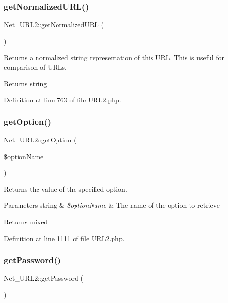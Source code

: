 \subsubsection{\texorpdfstring{get\+Normalized\+U\+R\+L()}{getNormalizedURL()}}
{\footnotesize\ttfamily Net\+\_\+\+U\+R\+L2\+::get\+Normalized\+U\+RL (\begin{DoxyParamCaption}{ }\end{DoxyParamCaption})}

Returns a normalized string representation of this U\+RL. This is useful for comparison of U\+R\+Ls.

\begin{DoxyReturn}{Returns}
string 
\end{DoxyReturn}


Definition at line 763 of file U\+R\+L2.\+php.

\mbox{\label{classNet__URL2_a4da2891e3eac1700940ae6cf483a0dd3}} 
\subsubsection{\texorpdfstring{get\+Option()}{getOption()}}
{\footnotesize\ttfamily Net\+\_\+\+U\+R\+L2\+::get\+Option (\begin{DoxyParamCaption}\item[{}]{\$option\+Name }\end{DoxyParamCaption})}

Returns the value of the specified option.


\begin{DoxyParams}[1]{Parameters}
string & {\em \$option\+Name} & The name of the option to retrieve\\
\hline
\end{DoxyParams}
\begin{DoxyReturn}{Returns}
mixed 
\end{DoxyReturn}


Definition at line 1111 of file U\+R\+L2.\+php.

\mbox{\label{classNet__URL2_a8cfbc773d2c8bb6727da1526770c4b9a}} 
\subsubsection{\texorpdfstring{get\+Password()}{getPassword()}}
{\footnotesize\ttfamily Net\+\_\+\+U\+R\+L2\+::get\+Password (\begin{DoxyParamCaption}{ }\end{DoxyParamCaption})}

